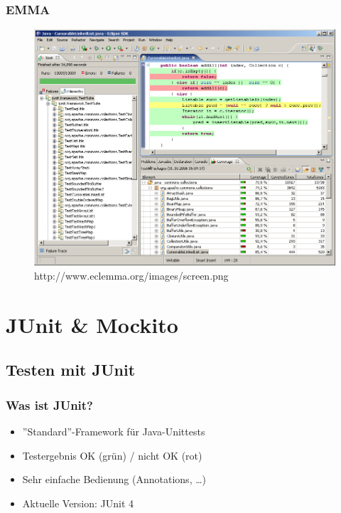 \documentclass{beamer}
\begin{document}
			\begin{frame}
				\frametitle{EMMA}

				\begin{figure}[htb]
					\begin{center}
						\includegraphics[scale=0.25]{eclemma}
					\end{center}
					\caption{http://www.eclemma.org/images/screen.png}
				\end{figure}
			\end{frame}

	
	\section{JUnit \& Mockito}

		\subsection{Testen mit JUnit}

			\begin{frame}
				\frametitle{Was ist JUnit?}

				\begin{itemize}
					\item{''Standard''-Framework für Java-Unittests}
					\item{Testergebnis OK (grün) / nicht OK (rot)}
					\item{Sehr einfache Bedienung (Annotations, \ldots)}
					\item{Aktuelle Version: JUnit 4}
				\end{itemize}
			\end{frame}
\end{document}
